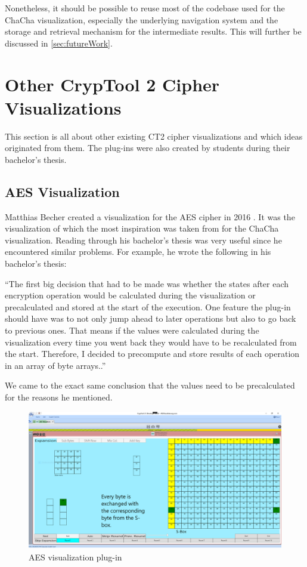 Nonetheless, it should be possible to reuse most of the codebase used for the ChaCha visualization, especially the underlying navigation system and the storage and retrieval mechanism for the intermediate results. This will further be discussed in \autoref{sec:futureWork}.

\section{Other CrypTool 2 Cipher Visualizations}
\label{sec:otherCT2CipherVisualizations}

This section is all about other existing CT2 cipher visualizations and which ideas originated from them. The plug-ins were also created by students during their bachelor's thesis.

\subsection{AES Visualization}
\label{sec:aesVisualization}

Matthias Becher created a visualization for the AES cipher in 2016 \cite{aesthesis}. It was the visualization of which the most inspiration was taken from for the ChaCha visualization. Reading through his bachelor's thesis was very useful since he encountered similar problems. For example, he wrote the following in his bachelor's thesis:

``The first big decision that had to be made was whether the states after each encryption operation would be calculated during the visualization or precalculated and stored at the start of the execution. One feature the plug-in should have was to not only jump ahead to later operations but also to go back to previous ones. That means if the values were calculated during the visualization every time you went back they would have to be recalculated from the start. Therefore, I decided to precompute and store results of each operation in an array of byte arrays..'' \cite{aesthesis}

We came to the exact same conclusion that the values need to be precalculated for the reasons he mentioned.

\begin{figure}
\centering
\includegraphics[width=\textwidth]{figures/ct2/aes.png}
\caption{AES visualization plug-in}
\label{fig:aes}
\end{figure}

